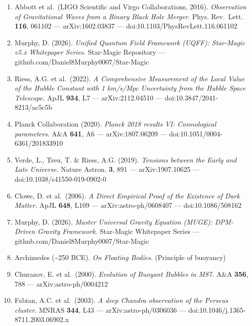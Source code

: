 \begin{enumerate}
\def\labelenumi{\arabic{enumi}.}
\tightlist
\item
  Abbott et al.~(LIGO Scientific and Virgo Collaborations, 2016).
  \emph{Observation of Gravitational Waves from a Binary Black Hole
  Merger.} Phys. Rev.~Lett. \textbf{116}, 061102 --- arXiv:1602.03837
  --- doi:10.1103/PhysRevLett.116.061102
\item
  Murphy, D. (2026). \emph{Unified Quantum Field Framework (UQFF):
  Star-Magic v5.x Whitepaper Series.} Star-Magic Repository ---
  github.com/Daniel8Murphy0007/Star-Magic
\item
  Riess, A.G. et al.~(2022). \emph{A Comprehensive Measurement of the
  Local Value of the Hubble Constant with 1 km/s/Mpc Uncertainty from
  the Hubble Space Telescope.} ApJL \textbf{934}, L7 ---
  arXiv:2112.04510 --- doi:10.3847/2041-8213/ac5c5b
\item
  Planck Collaboration (2020). \emph{Planck 2018 results VI:
  Cosmological parameters.} A\&A \textbf{641}, A6 --- arXiv:1807.06209
  --- doi:10.1051/0004-6361/201833910
\item
  Verde, L., Treu, T. \& Riess, A.G. (2019). \emph{Tensions between the
  Early and Late Universe.} Nature Astron. \textbf{3}, 891 ---
  arXiv:1907.10625 --- doi:10.1038/s41550-019-0902-0
\item
  Clowe, D. et al.~(2006). \emph{A Direct Empirical Proof of the
  Existence of Dark Matter.} ApJL \textbf{648}, L109 ---
  arXiv:astro-ph/0608407 --- doi:10.1086/508162
\item
  Murphy, D. (2026). \emph{Master Universal Gravity Equation (MUGE):
  DPM-Driven Gravity Framework.} Star-Magic Whitepaper Series ---
  github.com/Daniel8Murphy0007/Star-Magic
\item
  Archimedes (\textasciitilde250 BCE). \emph{On Floating Bodies.}
  (Principle of buoyancy)
\item
  Churazov, E. et al.~(2000). \emph{Evolution of Buoyant Bubbles in
  M87.} A\&A \textbf{356}, 788 --- arXiv:astro-ph/0004212
\item
  Fabian, A.C. et al.~(2003). \emph{A deep Chandra observation of the
  Perseus cluster.} MNRAS \textbf{344}, L43 --- arXiv:astro-ph/0306036
  --- doi:10.1046/j.1365-8711.2003.06902.x
\end{enumerate}
